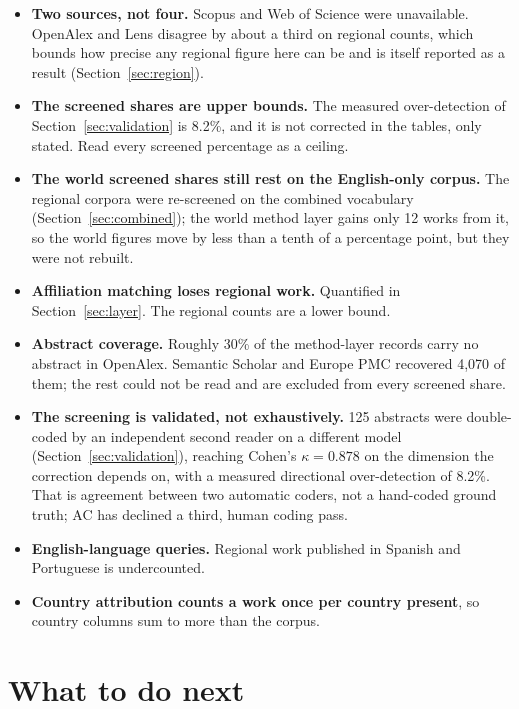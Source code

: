 \documentclass[11pt,a4paper]{article}
\begin{document}
\begin{itemize}
\item \textbf{Two sources, not four.} Scopus and Web of Science were unavailable. OpenAlex
      and Lens disagree by about a third on regional counts, which bounds how precise any
      regional figure here can be and is itself reported as a result
      (Section~\ref{sec:region}).
\item \textbf{The screened shares are upper bounds.} The measured over-detection of
      Section~\ref{sec:validation} is 8.2\%, and it is not corrected in the tables, only
      stated. Read every screened percentage as a ceiling.
\item \textbf{The world screened shares still rest on the English-only corpus.} The regional
      corpora were re-screened on the combined vocabulary
      (Section~\ref{sec:combined}); the world method layer gains only 12 works from it, so
      the world figures move by less than a tenth of a percentage point, but they were not
      rebuilt.
\item \textbf{Affiliation matching loses regional work.} Quantified in
      Section~\ref{sec:layer}. The regional counts are a lower bound.
\item \textbf{Abstract coverage.} Roughly 30\% of the method-layer records carry no abstract
      in OpenAlex. Semantic Scholar and Europe PMC recovered 4{,}070 of them; the rest could
      not be read and are excluded from every screened share.
\item \textbf{The screening is validated, not exhaustively.} 125 abstracts were double-coded
      by an independent second reader on a different model (Section~\ref{sec:validation}),
      reaching Cohen's $\kappa=0.878$ on the dimension the correction depends on, with a
      measured directional over-detection of 8.2\%. That is agreement between two automatic
      coders, not a hand-coded ground truth; AC has declined a third, human coding pass.
\item \textbf{English-language queries.} Regional work published in Spanish and Portuguese
      is undercounted.
\item \textbf{Country attribution counts a work once per country present}, so country
      columns sum to more than the corpus.
\end{itemize}

\section{What to do next}
\end{document}
